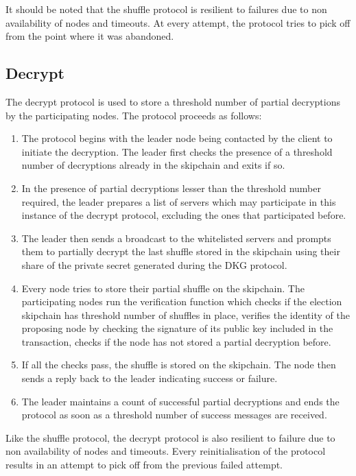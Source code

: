 It should be noted that the shuffle protocol is resilient to failures due to non availability of nodes and timeouts. At every attempt, the protocol tries to pick off from the point where it was abandoned.

\subsection{Decrypt}

The decrypt protocol is used to store a threshold number of partial decryptions by the participating nodes. The protocol proceeds as follows:

\begin{enumerate}
  \item The protocol begins with the leader node being contacted by the client to initiate the decryption. The leader first checks the presence of a threshold number of decryptions already in the skipchain and exits if so.
  \item In the presence of partial decryptions lesser than the threshold number required, the leader prepares a list of servers which may participate in this instance of the decrypt protocol, excluding the ones that participated before.
  \item The leader then sends a broadcast to the whitelisted servers and prompts them to partially decrypt the last shuffle stored in the skipchain using their share of the private secret generated during the DKG protocol.
  \item Every node tries to store their partial shuffle on the skipchain. The participating nodes run the verification function which checks if the election skipchain has threshold number of shuffles in place, verifies the identity of the proposing node by checking the signature of its public key included in the transaction, checks if the node has not stored a partial decryption before.
  \item If all the checks pass, the shuffle is stored on the skipchain. The node then sends a reply back to the leader indicating success or failure.
  \item The leader maintains a count of successful partial decryptions and ends the protocol as soon as a threshold number of success messages are received.
 \end{enumerate}
 
 Like the shuffle protocol, the decrypt protocol is also resilient to failure due to non availability of nodes and timeouts. Every reinitialisation of the protocol results in an attempt to pick off from the previous failed attempt.
